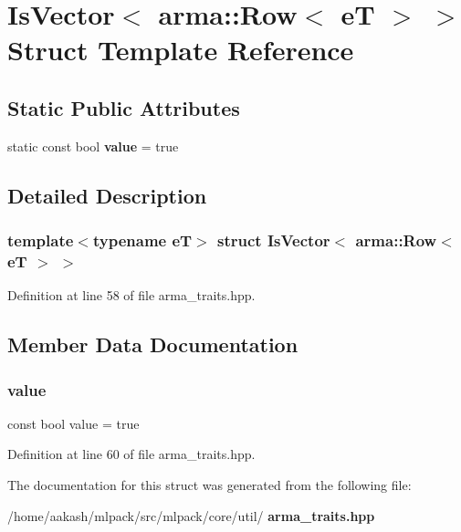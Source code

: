\section{Is\+Vector$<$ arma\+:\+:Row$<$ eT $>$ $>$ Struct Template Reference}
\label{structIsVector_3_01arma_1_1Row_3_01eT_01_4_01_4}
\subsection*{Static Public Attributes}
\begin{DoxyCompactItemize}
\item 
static const bool \textbf{ value} = true
\end{DoxyCompactItemize}


\subsection{Detailed Description}
\subsubsection*{template$<$typename eT$>$\newline
struct Is\+Vector$<$ arma\+::\+Row$<$ e\+T $>$ $>$}



Definition at line 58 of file arma\+\_\+traits.\+hpp.



\subsection{Member Data Documentation}
\mbox{\label{structIsVector_3_01arma_1_1Row_3_01eT_01_4_01_4_a11ddd051208250c32dc4985abcafa86d}} 
\subsubsection{value}
{\footnotesize\ttfamily const bool value = true\hspace{0.3cm}{\ttfamily [static]}}



Definition at line 60 of file arma\+\_\+traits.\+hpp.



The documentation for this struct was generated from the following file\+:\begin{DoxyCompactItemize}
\item 
/home/aakash/mlpack/src/mlpack/core/util/\textbf{ arma\+\_\+traits.\+hpp}\end{DoxyCompactItemize}
